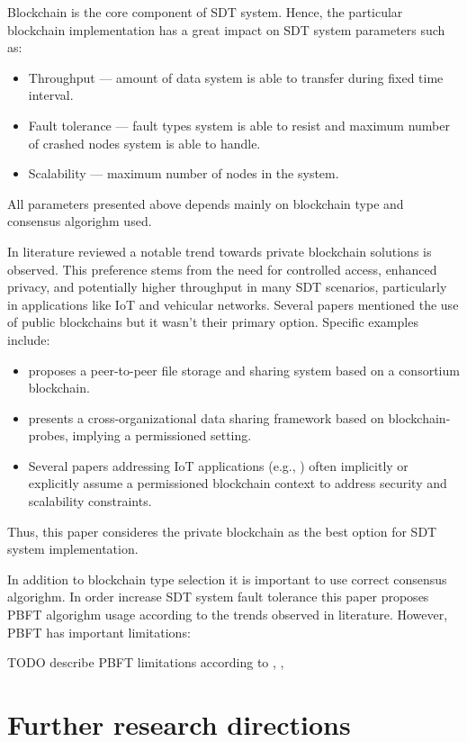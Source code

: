 \documentclass[10pt]{llncs}
\begin{document}
Blockchain is the core component of SDT system.
Hence, the particular blockchain implementation has a great impact on SDT system parameters such as:

\begin{itemize}
    \item Throughput --- amount of data system is able to transfer during fixed time interval.
    \item Fault tolerance --- fault types system is able to resist and maximum number of crashed nodes system is able to handle.
    \item Scalability --- maximum number of nodes in the system.
\end{itemize}

All parameters presented above depends mainly on blockchain type and consensus algorighm used.

In literature reviewed a notable trend towards private blockchain solutions is observed.
This preference stems from the need for controlled access, enhanced privacy, and potentially higher throughput in many SDT scenarios, particularly in applications like IoT and vehicular networks. 
Several papers mentioned the use of public blockchains but it wasn't their primary option. 
Specific examples include:

\begin{itemize}
    \item \cite{Peng2023} proposes a peer-to-peer file storage and sharing system based on a consortium blockchain.
    \item \cite{Jia2023} presents a cross-organizational data sharing framework based on blockchain-probes, implying a permissioned setting.
    \item Several papers addressing IoT applications (e.g., \cite{Ai2022,Gupta2022}) often implicitly or explicitly assume a permissioned blockchain context to address security and scalability constraints.
\end{itemize}

Thus, this paper consideres the private blockchain as the best option for SDT system implementation.

In addition to blockchain type selection it is important to use correct consensus algorighm.
In order increase SDT system fault tolerance this paper proposes PBFT algorighm usage according to the trends observed in literature.
However, PBFT has important limitations:

TODO describe PBFT limitations according to \cite{Bogdanov2024}, \cite{Ke2023}, \cite{Fan2020} 

\section{Further research directions} \label{further_research_directions}



\end{document}
